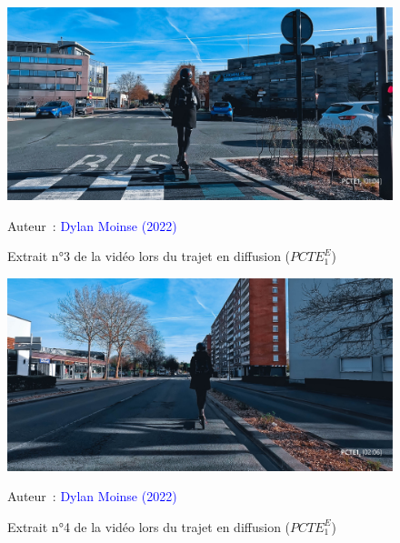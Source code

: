     \begin{figure}[h!]\vspace*{4pt}
        \caption*{Extrait n°3 de la vidéo lors du trajet en diffusion (\(PCTE^{E}_{1}\))}
        \centerline{\includegraphics[width=0.75\columnwidth]{src/Figures/Annexes/Extrait_Video_PCTE1_Egress_3.jpg}}
        \vspace{5pt}
        \begin{flushright}\scriptsize{
        Auteur~: \textcolor{blue}{Dylan Moinse (2022)}
        }\end{flushright}
    \end{figure}

    \begin{figure}[h!]\vspace*{4pt}
        \caption*{Extrait n°4 de la vidéo lors du trajet en diffusion (\(PCTE^{E}_{1}\))}
        \centerline{\includegraphics[width=0.75\columnwidth]{src/Figures/Annexes/Extrait_Video_PCTE1_Egress_4.jpg}}
        \vspace{5pt}
        \begin{flushright}\scriptsize{
        Auteur~: \textcolor{blue}{Dylan Moinse (2022)}
        }\end{flushright}
    \end{figure}

